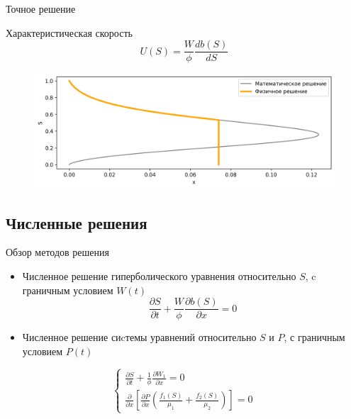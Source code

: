 \documentclass[14pt, aspectratio=169]{beamer}
\begin{document}
\begin{frame} {Точное решение}

    \begin{block}{Характеристическая скорость}
    $$
    U(S) = \frac{W}{\phi} \frac{d b(S)}{d S}
    $$
    \end{block}

    \begin{figure}
        \includegraphics[width=0.7\linewidth]{characteristic-solution.png}
    \end{figure}

\end{frame}

\subsection{Численные решения}

\begin{frame} {Обзор методов решения}

    \begin{itemize}
        \item Численное решение гиперболического уравнения относительно $S$, c граничным условием $W(t)$ \\ $$
        \frac{\partial S }{\partial t} + \frac{W}{\phi} \frac{\partial b(S)}{\partial x} = 0
        $$
        
        \item Численное решение сиcтемы уравнений относительно $S$ и $P$, с граничным условием $P(t)$
    \end{itemize}

    \begin{equation*}
        \begin{cases}
            \frac{\partial S }{\partial t} + \frac{1}{\phi} \frac{\partial W_1}{\partial x} = 0\\
            \frac{\partial}{\partial x} \left[ \frac{\partial P}{\partial x} \left( \frac{f_1(S)}{\mu_1} + \frac{f_2(S)}{\mu_2} \right) \right] = 0
        \end{cases}
    \end{equation*}
    

\end{frame}
\end{document}
